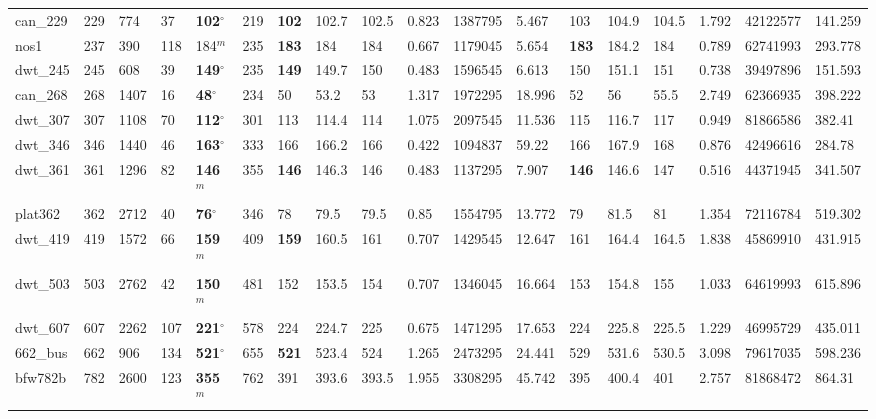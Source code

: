 \begin{table}[h!]
{\begin{tabular}{llllllllllllllllll}
            can\_229 & 229 & 774 & 37 & \textbf{102}$^{\circ}$ & 219 & \textbf{102} & 102.7 & 102.5 & 0.823 & 1387795 & 5.467 & 103 & 104.9 & 104.5 & 1.792 & 42122577 & 141.259 \\
            nos1 & 237 & 390 & 118 & 184$^{m}$ & 235 & \textbf{183} & 184 & 184 & 0.667 & 1179045 & 5.654 & \textbf{183} & 184.2 & 184 & 0.789 & 62741993 & 293.778 \\
            dwt\_245 & 245 & 608 & 39 & \textbf{149}$^{\circ}$ & 235 & \textbf{149} & 149.7 & 150 & 0.483 & 1596545 & 6.613 & 150 & 151.1 & 151 & 0.738 & 39497896 & 151.593 \\
            can\_268 & 268 & 1407 & 16 & \textbf{48}$^{\circ}$ & 234 & 50 & 53.2 & 53 & 1.317 & 1972295 & 18.996 & 52 & 56 & 55.5 & 2.749 & 62366935 & 398.222 \\
            dwt\_307 & 307 & 1108 & 70 & \textbf{112}$^{\circ}$ & 301 & 113 & 114.4 & 114 & 1.075 & 2097545 & 11.536 & 115 & 116.7 & 117 & 0.949 & 81866586 & 382.41 \\
            dwt\_346 & 346 & 1440 & 46 & \textbf{163}$^{\circ}$ & 333 & 166 & 166.2 & 166 & 0.422 & 1094837 & 59.22 & 166 & 167.9 & 168 & 0.876 & 42496616 & 284.78 \\
            dwt\_361 & 361 & 1296 & 82 & \textbf{146}$^{m}$ & 355 & \textbf{146} & 146.3 & 146 & 0.483 & 1137295 & 7.907 & \textbf{146} & 146.6 & 147 & 0.516 & 44371945 & 341.507 \\
            plat362 & 362 & 2712 & 40 & \textbf{76}$^{\circ}$ & 346 & 78 & 79.5 & 79.5 & 0.85 & 1554795 & 13.772 & 79 & 81.5 & 81 & 1.354 & 72116784 & 519.302 \\
            dwt\_419 & 419 & 1572 & 66 & \textbf{159}$^{m}$ & 409 & \textbf{159} & 160.5 & 161 & 0.707 & 1429545 & 12.647 & 161 & 164.4 & 164.5 & 1.838 & 45869910 & 431.915 \\
            dwt\_503 & 503 & 2762 & 42 & \textbf{150}$^{m}$ & 481 & 152 & 153.5 & 154 & 0.707 & 1346045 & 16.664 & 153 & 154.8 & 155 & 1.033 & 64619993 & 615.896 \\
            dwt\_607 & 607 & 2262 & 107 & \textbf{221}$^{\circ}$ & 578 & 224 & 224.7 & 225 & 0.675 & 1471295 & 17.653 & 224 & 225.8 & 225.5 & 1.229 & 46995729 & 435.011 \\
            662\_bus & 662 & 906 & 134 & \textbf{521}$^{\circ}$ & 655 & \textbf{521} & 523.4 & 524 & 1.265 & 2473295 & 24.441 & 529 & 531.6 & 530.5 & 3.098 & 79617035 & 598.236 \\
            bfw782b & 782 & 2600 & 123 & \textbf{355}$^{m}$ & 762 & 391 & 393.6 & 393.5 & 1.955 & 3308295 & 45.742 & 395 & 400.4 & 401 & 2.757 & 81868472 & 864.31 \\

\end{tabular}}
\end{table}
